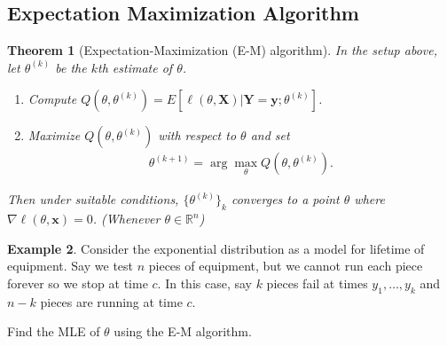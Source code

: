 \documentclass[11pt]{amsart}
\newtheorem{theorem}{Theorem}[section]
\theoremstyle{definition}
\newtheorem{example}[theorem]{Example}
\numberwithin{equation}{section}
\begin{document}
\subsection{Expectation Maximization Algorithm}
\begin{theorem}[Expectation-Maximization (E-M) algorithm]
    In the setup above, let $\theta^{(k)}$ be the $k$th estimate of $\theta$. 
    \begin{enumerate}
        \item [(i)] Compute $Q(\theta,\theta^{(k)})=E[\ell(\theta,\mathbf{X})|\mathbf{Y}=\mathbf{y};\theta^{(k)}]$.
        \item [(ii)] Maximize $Q(\theta,\theta^{(k)})$ with respect to $\theta$ and set
        \begin{align*}
            \theta^{(k+1)}=\arg\max_\theta Q(\theta,\theta^{(k)}).
        \end{align*}
    \end{enumerate}
    Then under suitable conditions, $\{\theta^{(k)}\}_k$ converges to a point $\theta$ where $\nabla \ell(\theta,\mathbf x)=0$. (Whenever $\theta\in\mathbb R^n$)
\end{theorem}
\begin{example}
    Consider the exponential distribution as a model for lifetime of equipment. Say we test $n$ pieces of equipment, but we cannot run each piece forever so we stop at time $c$. In this case, say $k$ pieces fail at times $y_1,\ldots,y_k$ and $n-k$ pieces are running at time $c$. 

    Find the MLE of $\theta$ using the E-M algorithm.
\end{example}
\addtocounter{theorem}{-1}
\end{document}
